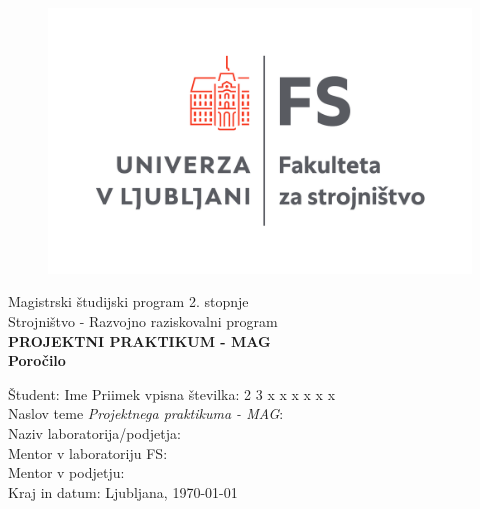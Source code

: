 \begin{titlepage}
\begin{center}
\begin{figure}[!hb]
\centering
\includegraphics[scale=0.4]{slike/FS_logo}
\end{figure}
\Large{Magistrski študijski program 2. stopnje\\
Strojništvo - Razvojno raziskovalni program}\\
[2cm]
\Large\textbf{PROJEKTNI PRAKTIKUM - MAG}
\\[0.5cm]
\Large\textbf{Poročilo}
\\[2cm]
\end{center}
Študent: {\large Ime Priimek} \hfill vpisna številka: {\large 2 3 x x x x x x}
\\[1cm]
Naslov teme \textit{Projektnega praktikuma - MAG}: 
\\[0.5cm]
Naziv laboratorija/podjetja: 
\\[1cm]
Mentor v laboratoriju FS: 
\\[0.5cm]
Mentor v podjetju: 
\\[2.5cm]
Kraj in datum: Ljubljana, \today
\end{titlepage}
